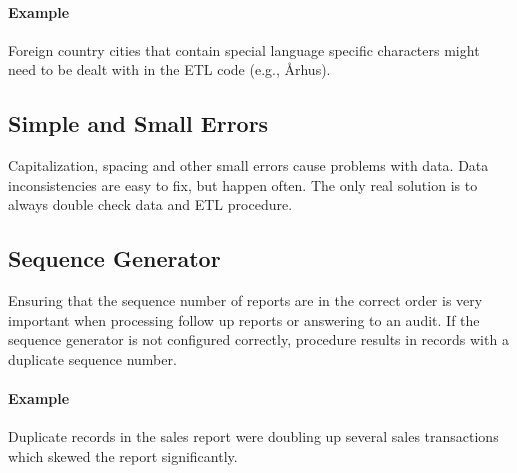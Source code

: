 \paragraph*{Example} Foreign country cities that contain special language specific characters might need to be dealt with in the ETL code (e.g., Århus).


\subsection*{Simple and Small Errors}

Capitalization, spacing and other small errors cause problems with data.
Data inconsistencies are easy to fix, but happen often.
The only real solution is to always double check data and ETL procedure.


\subsection*{Sequence Generator}

Ensuring that the sequence number of reports are in the correct order is very important when processing follow up reports or answering to an audit.
If the sequence generator is not configured correctly, procedure results in records with a duplicate sequence number.

\paragraph*{Example} Duplicate records in the sales report were doubling up several sales transactions which skewed the report significantly.


